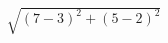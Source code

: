 \documentclass[preview]{standalone}
\begin{document}
\begin{align*}
\sqrt{ ( 7 - 3 ) ^{2} + ( 5 - 2 ) ^{2}}
\end{align*}
\end{document}
